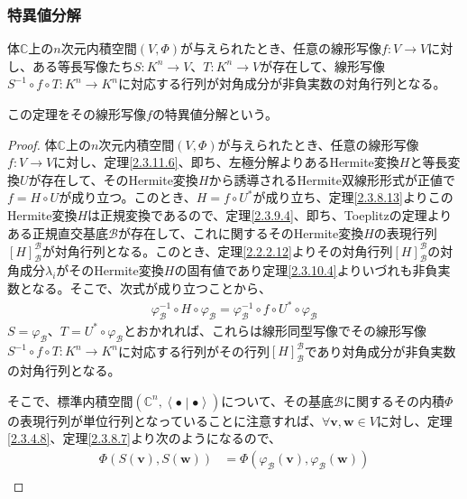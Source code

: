 \documentclass[dvipdfmx]{jsarticle}
\begin{document}
\subsubsection{特異値分解}%
\begin{thm}[特異値分解]\label{2.3.11.8}
体$\mathbb{C}$上の$n$次元内積空間$(V,\varPhi)$が与えられたとき、任意の線形写像$f:V \rightarrow V$に対し、ある等長写像たち$S:K^{n} \rightarrow V$、$T:K^{n} \rightarrow V$が存在して、線形写像$S^{- 1} \circ f \circ T:K^{n} \rightarrow K^{n}$に対応する行列が対角成分が非負実数の対角行列となる。\par
この定理をその線形写像$f$の特異値分解という。
\end{thm}
\begin{proof}
体$\mathbb{C}$上の$n$次元内積空間$(V,\varPhi)$が与えられたとき、任意の線形写像$f:V \rightarrow V$に対し、定理\ref{2.3.11.6}、即ち、左極分解よりあるHermite変換$H$と等長変換$U$が存在して、そのHermite変換$H$から誘導されるHermite双線形形式が正値で$f = H \circ U$が成り立つ。このとき、$H = f \circ U^{*}$が成り立ち、定理\ref{2.3.8.13}よりこのHermite変換$H$は正規変換であるので、定理\ref{2.3.9.4}、即ち、Toeplitzの定理よりある正規直交基底$\mathcal{B}$が存在して、これに関するそのHermite変換$H$の表現行列$[ H]_{\mathcal{B}}^{\mathcal{B}}$が対角行列となる。このとき、定理\ref{2.2.2.12}よりその対角行列$[ H]_{\mathcal{B}}^{\mathcal{B}}$の対角成分$\lambda_{i}$がそのHermite変換$H$の固有値であり定理\ref{2.3.10.4}よりいづれも非負実数となる。そこで、次式が成り立つことから、
\begin{align*}
\varphi_{\mathcal{B}}^{- 1} \circ H \circ \varphi_{\mathcal{B}} = \varphi_{\mathcal{B}}^{- 1} \circ f \circ U^{*} \circ \varphi_{\mathcal{B}}
\end{align*}
$S = \varphi_{\mathcal{B}}$、$T = U^{*} \circ \varphi_{\mathcal{B}}$とおかれれば、これらは線形同型写像でその線形写像$S^{- 1} \circ f \circ T:K^{n} \rightarrow K^{n}$に対応する行列がその行列$[ H]_{\mathcal{B}}^{\mathcal{B}}$であり対角成分が非負実数の対角行列となる。\par
そこで、標準内積空間$\left( \mathbb{C}^{n},\left\langle \bullet \middle| \bullet \right\rangle \right)$について、その基底$\mathcal{B}$に関するその内積$\varPhi$の表現行列が単位行列となっていることに注意すれば、$\forall\mathbf{v},\mathbf{w} \in V$に対し、定理\ref{2.3.4.8}、定理\ref{2.3.8.7}より次のようになるので、
\begin{align*}
\varPhi\left( S\left( \mathbf{v} \right),S\left( \mathbf{w} \right) \right) &= \varPhi\left( \varphi_{\mathcal{B}}\left( \mathbf{v} \right),\varphi_{\mathcal{B}}\left( \mathbf{w} \right) \right)\\

\end{align*}
\end{proof}
\end{document}
